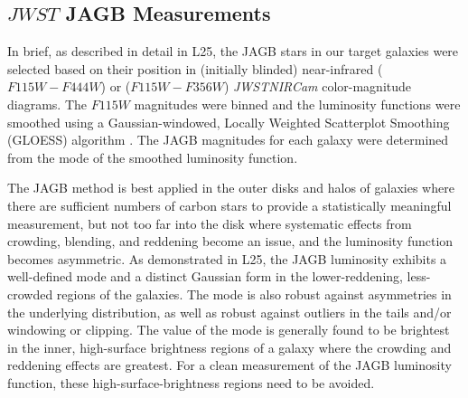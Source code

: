 \documentclass[12pt,modern]{aastex631}
\newcommand{\hstacs}{\emph{HST/ACS}\xspace}
\newcommand{\jwst}{\emph{JWST}\xspace}
\newcommand{\nircam}{\emph{NIRCam}\xspace}
\newcommand{\ngc}{NGC\,\xspace}
\begin{document}


\subsection{$JWST$ JAGB Measurements}
\label{sec:jagbjwst}

In brief, as described in detail in L25, the JAGB stars in our target galaxies were selected based on their position in (initially blinded) near-infrared ($F115W - F444W$) or ($F115W-F356W$) \jwst \nircam color-magnitude diagrams. The $F115W$ magnitudes were binned and the luminosity functions  were smoothed using a Gaussian-windowed, Locally Weighted Scatterplot Smoothing (GLOESS) algorithm \citep[e.g.,][]{persson_2004}. The JAGB magnitudes for each galaxy were determined from the mode of the smoothed luminosity function.

The JAGB method is best applied in the outer disks and halos of galaxies where  there are  sufficient numbers of carbon stars to provide a statistically meaningful measurement, but not too far into the disk where systematic effects from crowding, blending, and reddening become an issue, and the luminosity function becomes asymmetric. As demonstrated in L25, the JAGB luminosity exhibits a well-defined mode and a distinct Gaussian form in the lower-reddening, less-crowded regions of the galaxies. The mode is also robust against asymmetries in the underlying distribution, as well as robust against outliers in the tails and/or windowing or clipping. The value of the mode is generally found to be brightest in the inner, high-surface brightness regions of a galaxy where the crowding and reddening effects are greatest. For a clean measurement of the JAGB luminosity function, these high-surface-brightness regions need to be avoided. 
\end{document}
